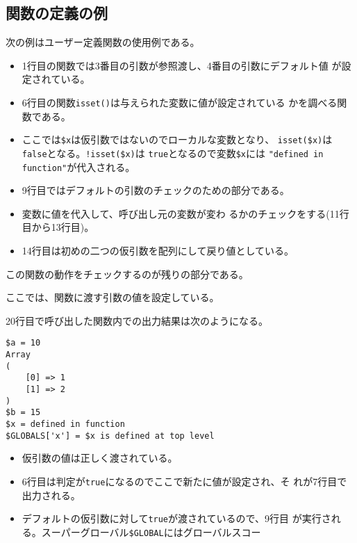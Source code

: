 \subsection{関数の定義の例}
\begin{Exec}\upshape
 次の例はユーザー定義関数の使用例である。
\begin{itemize}
 \item 1行目の関数では3番目の引数が参照渡し、4番目の引数にデフォルト値
       が設定されている。 
 \item 6行目の関数\texttt{isset()}は与えられた変数に値が設定されている
       かを調べる関数である。
 \item ここでは\Verb+$x+は仮引数ではないのでローカルな変数となり、
       \Verb+isset($x)+は\texttt{false}となる。\Verb+!isset($x)+は
       \texttt{true}となるので変数\Verb+$x+には
       \Verb+"defined in function"+が代入される。
 \item 9行目ではデフォルトの引数のチェックのための部分である。
 \item 変数に値を代入して、呼び出し元の変数が変わ
       るかのチェックをする(11行目から13行目)。
 \item 14行目は初めの二つの仮引数を配列にして戻り値としている。
\end{itemize}
この関数の動作をチェックするのが残りの部分である。
 \iffalse
 \begin{listingcont}
$a = 10;
$as = array(1,2);
$b = 15;
$x = "\$x is defined at top level";
 \end{listingcont}
 \fi
 ここでは、関数に渡す引数の値を設定している。
 \iffalse
 \begin{listingcont}
example($a, $as, $b, true);
print "\$a = $a\n";
print_r($as);  
print "\$b = $b\n";
 \end{listingcont}
\fi
20行目で呼び出した関数内での出力結果は次のようになる。
\begin{Verbatim}
$a = 10
Array
(
    [0] => 1
    [1] => 2
)
$b = 15
$x = defined in function
$GLOBALS['x'] = $x is defined at top level
\end{Verbatim}
\begin{itemize}
 \item 仮引数の値は正しく渡されている。
 \item 6行目は判定が\texttt{true}になるのでここで新たに値が設定され、そ
       れが7行目で出力される。
 \item デフォルトの仮引数に対して\texttt{true}が渡されているので、9行目
       が実行される。スーパーグローバル\Verb+$GLOBAL+にはグローバルスコー

\end{itemize}
\end{Exec}
